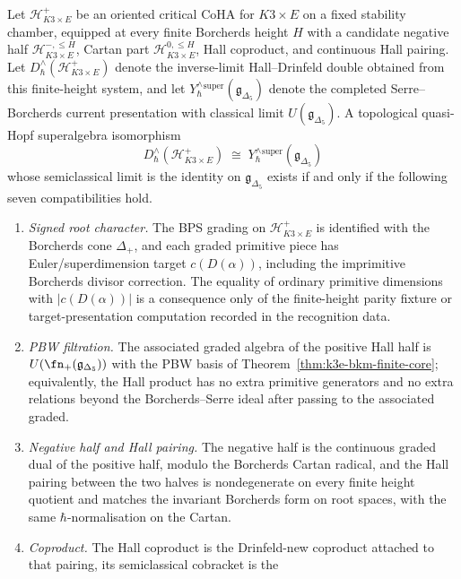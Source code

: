 \begin{theorem}
\label{thm:k3e-hall-drinfeld-super-yangian-criterion}
Let $\mathcal H^+_{K3\times E}$ be an oriented critical CoHA for
$K3\times E$ on a fixed stability chamber, equipped at every
finite Borcherds height $H$ with a candidate negative half
\(\mathcal H^{-,\leq H}_{K3\times E}\), Cartan part
\(\mathcal H^{0,\leq H}_{K3\times E}\), Hall coproduct, and continuous
Hall pairing. Let
$D^\wedge_\hbar(\mathcal H^+_{K3\times E})$ denote the inverse-limit
Hall--Drinfeld double obtained from this finite-height system, and let
$Y^\wedge_\hbar{}^{\mathrm{super}}(\mathfrak g_{\Delta_5})$ denote the
completed Serre--Borcherds current presentation with classical limit
$U(\mathfrak g_{\Delta_5})$. A topological quasi-Hopf superalgebra
isomorphism
\[
 D^\wedge_\hbar(\mathcal H^+_{K3\times E})
 \;\cong\;
 Y^\wedge_\hbar{}^{\mathrm{super}}(\mathfrak g_{\Delta_5})
\]
whose semiclassical limit is the identity on
$\mathfrak g_{\Delta_5}$ exists if and only if the following seven
compatibilities hold.
\begin{enumerate}[label=\textup{(\roman*)}]
\item \emph{Signed root character.} The BPS grading on
$\mathcal H^+_{K3\times E}$ is identified with the Borcherds cone
$\Delta_+$, and each graded primitive piece has Euler/superdimension
target \(c(D(\alpha))\), including the imprimitive Borcherds divisor
correction. The equality of ordinary primitive dimensions with
\(|c(D(\alpha))|\) is a consequence only of the finite-height parity
fixture or target-presentation computation recorded in the recognition
data.
\item \emph{PBW filtration.} The associated graded algebra of the positive
Hall half is $U(\fn_+(\mathfrak g_{\Delta_5}))$ with the PBW basis of
Theorem~\ref{thm:k3e-bkm-finite-core}; equivalently, the Hall product
has no extra primitive generators and no extra relations beyond the
Borcherds--Serre ideal after passing to the associated graded.
\item \emph{Negative half and Hall pairing.} The negative half is the
continuous graded dual of the positive half, modulo the Borcherds
Cartan radical, and the Hall pairing between the two halves is
nondegenerate on every finite height quotient and
matches the invariant Borcherds form on root spaces, with the same
$\hbar$-normalisation on the Cartan.
\item \emph{Coproduct.} The Hall coproduct is the Drinfeld-new coproduct
attached to that pairing, its semiclassical cobracket is the

\end{enumerate}
\end{theorem}

